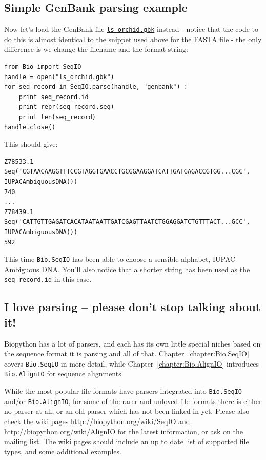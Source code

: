\documentclass{report}
\begin{document}
\subsection{Simple GenBank parsing example}

Now let's load the GenBank file \href{http://biopython.org/DIST/docs/tutorial/examples/ls_orchid.gbk}{\tt ls\_orchid.gbk} instead - notice that the code to do this is almost identical to the snippet used above for the FASTA file - the only difference is we change the filename and the format string:

\begin{verbatim}
from Bio import SeqIO
handle = open("ls_orchid.gbk")
for seq_record in SeqIO.parse(handle, "genbank") :
    print seq_record.id
    print repr(seq_record.seq)
    print len(seq_record)
handle.close()
\end{verbatim}

\noindent This should give:

\begin{verbatim}
Z78533.1
Seq('CGTAACAAGGTTTCCGTAGGTGAACCTGCGGAAGGATCATTGATGAGACCGTGG...CGC', IUPACAmbiguousDNA())
740
...
Z78439.1
Seq('CATTGTTGAGATCACATAATAATTGATCGAGTTAATCTGGAGGATCTGTTTACT...GCC', IUPACAmbiguousDNA())
592
\end{verbatim}

This time \verb|Bio.SeqIO| has been able to choose a sensible alphabet, IUPAC Ambiguous DNA.  You'll also notice that a shorter string has been used as the \verb|seq_record.id| in this case.

\subsection{I love parsing -- please don't stop talking about it!}

Biopython has a lot of parsers, and each has its own little special niches based on the sequence format it is parsing and all of that.  Chapter~\ref{chapter:Bio.SeqIO} covers \verb|Bio.SeqIO| in more detail, while Chapter~\ref{chapter:Bio.AlignIO} introduces \verb|Bio.AlignIO| for sequence alignments.

While the most popular file formats have parsers integrated into \verb|Bio.SeqIO| and/or \verb|Bio.AlignIO|, for some of the rarer and unloved file formats there is either no parser at all, or an old parser which has not been linked in yet.
Please also check the wiki pages \url{http://biopython.org/wiki/SeqIO} and \url{http://biopython.org/wiki/AlignIO} for the latest information, or ask on the mailing list. The wiki pages should include an up to date list of supported file types, and some additional  examples.
\end{document}
